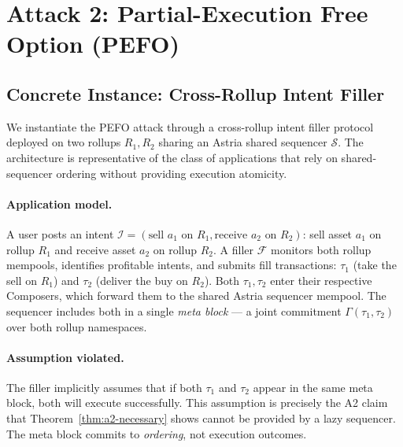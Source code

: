 %
%

\section{Attack 2: Partial-Execution Free Option (PEFO)}
\label{sec:pefo}

\subsection{Concrete Instance: Cross-Rollup Intent Filler}
\label{sec:pefo-instance}

We instantiate the PEFO attack through a cross-rollup intent filler protocol
deployed on two rollups $R_1, R_2$ sharing an Astria shared sequencer
$\mathcal{S}$. The architecture is representative of the class of applications
that rely on shared-sequencer ordering without providing execution atomicity.

\paragraph{Application model.}
A user posts an intent $\mathcal{I} = (\text{sell } a_1 \text{ on } R_1,
\text{receive } a_2 \text{ on } R_2)$: sell asset $a_1$ on rollup $R_1$ and
receive asset $a_2$ on rollup $R_2$. A filler $\mathcal{F}$ monitors both
rollup mempools, identifies profitable intents, and submits fill transactions:
$\tau_1$ (take the sell on $R_1$) and $\tau_2$ (deliver the buy on $R_2$).
Both $\tau_1, \tau_2$ enter their respective Composers, which forward them
to the shared Astria sequencer mempool. The sequencer includes both in a single
\emph{meta block} --- a joint commitment $\Gamma(\tau_1, \tau_2)$ over both
rollup namespaces.

\paragraph{Assumption violated.}
The filler implicitly assumes that if both $\tau_1$ and $\tau_2$ appear in the
same meta block, both will execute successfully. This assumption is precisely
the A2 claim that Theorem~\ref{thm:a2-necessary} shows cannot be provided by
a lazy sequencer. The meta block commits to \emph{ordering}, not execution
outcomes.

